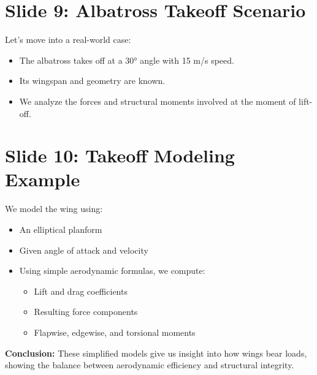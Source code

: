 \documentclass[12pt]{article}
\begin{document}
\section*{Slide 9: Albatross Takeoff Scenario}
Let’s move into a real-world case:
\begin{itemize}
    \item The albatross takes off at a 30° angle with 15 m/s speed.
    \item Its wingspan and geometry are known.
    \item We analyze the forces and structural moments involved at the moment of lift-off.
\end{itemize}

\section*{Slide 10: Takeoff Modeling Example}
We model the wing using:
\begin{itemize}
    \item An elliptical planform
    \item Given angle of attack and velocity
    \item Using simple aerodynamic formulas, we compute:
    \begin{itemize}
        \item Lift and drag coefficients
        \item Resulting force components
        \item Flapwise, edgewise, and torsional moments
    \end{itemize}
\end{itemize}

\textbf{Conclusion:} These simplified models give us insight into how wings bear loads, showing the balance between aerodynamic efficiency and structural integrity.
\end{document}
